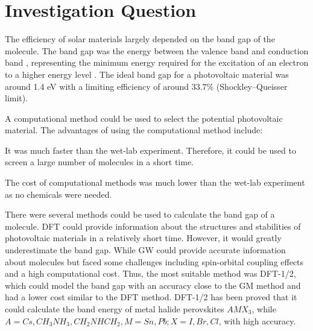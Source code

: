 \documentclass[twocolumn]{article} %
\let\tempthree\enumerate
\let\tempfour\endenumerate
\renewenvironment{enumerate}{\tempthree\setlength{\itemsep}{0pt}}{\tempfour}
\begin{document}




\section{Investigation Question}

The efficiency of solar materials largely depended on the band gap of the molecule. The band gap was the energy between the valence band and conduction band \cite{investigation}, representing the minimum energy required for the excitation of an electron to a higher energy level \cite{Bandgap2020}. The ideal band gap for a photovoltaic material was around 1.4 eV with a limiting efficiency of around 33.7\% (Shockley–Queisser limit). \cite{Bandgap1961} 

A computational method could be used to select the potential photovoltaic material. The advantages of using the computational method include:

\begin{enumerate}
      \item It was much faster than the wet-lab experiment. Therefore, it could be used to screen a large number of molecules in a short time.
      \item The cost of computational methods was much lower than the wet-lab experiment as no chemicals were needed. 
\end{enumerate}

There were several methods could be used to calculate the band gap of a molecule. DFT could provide information about the structures and stabilities of photovoltaic materials in a relatively short time. However, it would greatly underestimate the band gap. While GW could provide accurate information about molecules but faced some challenges including spin-orbital coupling effects and a high computational cost. Thus, the most suitable method was DFT-1/2, which could model the band gap with an accuracy close to the GM method and had a lower cost similar to the DFT method. DFT-1/2 has been proved that it could calculate the band energy of metal halide perovskites $AMX_3$, while $A=Cs, CH_3NH_3, CH_2NHCH_2, M=Sn, Pb; X=I, Br, Cl$, with high accuracy. 
\end{document}
